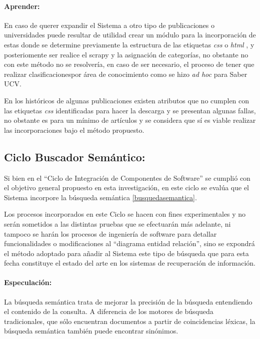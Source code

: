 \documentclass[
  12pt,
  openany]{book}
\begin{document}
\hypertarget{dcseisapre}{%
\paragraph{Aprender:}\label{dcseisapre}}

En caso de querer expandir el Sistema a otro tipo de publicaciones o universidades puede resultar de utilidad crear un módulo para la incorporación de estas donde se determine previamente la estructura de las etiquetas \emph{css} o \emph{html} , y posteriomente ser realice el scrapy y la asignación de categorías, no obstante no con este método no se resolvería, en caso de ser necesario, el proceso de tener que realizar clasificacionespor área de conocimiento como se hizo \emph{ad hoc} para Saber UCV.

En los históricos de algunas publicaciones existen atributos que no cumplen con las etiquetas \emph{css} identificadas para hacer la descarga y se presentan algunas fallas, no obstante es para un mínimo de artículos y se considera que sí es viable realizar las incorporaciones bajo el método propuesto.

\newpage

\hypertarget{desasarrollociclos5}{%
\subsection{Ciclo Buscador Semántico:}\label{desasarrollociclos5}}

Si bien en el ``Ciclo de Integración de Componentes de Software'' se cumplió con el objetivo general propuesto en esta investigación, en este ciclo se evalúa que el Sistema incorpore la búsqueda semántica \ref{busquedasemantica}.

Los procesos incorporados en este Ciclo se hacen con fines experimentales y no serán sometidos a las distintas pruebas que se efectuarán más adelante, ni tampoco se harán los procesos de ingeniería de software para detallar funcionalidades o modificaciones al ``diagrama entidad relación'', sino se expondrá el método adoptado para añadir al Sistema este tipo de búsqueda que para esta fecha constituye el estado del arte en los sistemas de recuperación de información.

\hypertarget{semanespe}{%
\paragraph{Especulación:}\label{semanespe}}

La búsqueda semántica trata de mejorar la precisión de la búsqueda entendiendo el contenido de la consulta. A diferencia de los motores de búsqueda tradicionales, que sólo encuentran documentos a partir de coincidencias léxicas, la búsqueda semántica también puede encontrar sinónimos.
\end{document}
